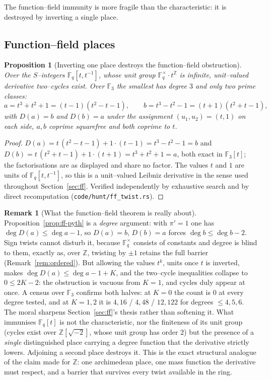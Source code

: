 \documentclass[11pt]{article}
\newtheorem{proposition}[theorem]{Proposition}
\theoremstyle{definition}
\newtheorem{remark}[theorem]{Remark}
\begin{document}
The function--field immunity is more fragile than the characteristic: it is destroyed by inverting
a single place.

\subsection{Function--field places}\label{ssec:ffplaces}

\begin{proposition}[Inverting one place destroys the function--field obstruction]\label{prop:ffsunit}
Over the $S$--integers $\mathbb{F}_q[t,t^{-1}]$, whose unit group $\mathbb{F}_q^\times\cdot t^{\mathbb{Z}}$
is infinite, unit--valued derivative two--cycles exist. Over $\mathbb{F}_3$ the smallest has degree
$3$ and only \emph{two} prime classes:
\[ a=t^3+t^2+1=(t-1)(t^2-t-1),\qquad b=t^3-t^2-1=(t+1)(t^2+t-1), \]
with $D(a)=b$ and $D(b)=a$ under the assignment $(u_1,u_2)=(t,1)$ on each side, $a,b$ coprime
squarefree and both coprime to $t$.
\end{proposition}
\begin{proof}
$D(a)=t\,(t^2-t-1)+1\cdot(t-1)=t^3-t^2-1=b$ and $D(b)=t\,(t^2+t-1)+1\cdot(t+1)=t^3+t^2+1=a$, both
exact in $\mathbb{F}_3[t]$; the factorisations are as displayed and share no factor. The values
$t$ and $1$ are units of $\mathbb{F}_q[t,t^{-1}]$, so this is a unit--valued Leibniz derivative in
the sense used throughout Section~\ref{sec:ff}. Verified independently by exhaustive search and by
direct recomputation (\texttt{code/hunt/ff\_twist.rs}).
\end{proof}

\begin{remark}[What the function--field theorem is really about]\label{rem:ffplaces}
Proposition~\ref{prop:ff-pyth} is a \emph{degree} argument: with $\pi'=1$ one has
$\deg D(a)\le\deg a-1$, so $D(a)=b$, $D(b)=a$ forces $\deg b\le\deg b-2$. Sign twists cannot
disturb it, because $\mathbb{F}_q^\times$ consists of constants and degree is blind to them,
exactly as, over $\mathbb{Z}$, twisting by $\pm1$ retains the full barrier
(Remark~\ref{rem:ordered}). But allowing the values $t^{k}$, units once $t$ is inverted, makes
$\deg D(a)\le\deg a-1+K$, and the two--cycle inequalities collapse to $0\le2K-2$: the obstruction
is vacuous from $K=1$, and cycles duly appear at once. A census over $\mathbb{F}_3$ confirms both
halves: at $K=0$ the count is $0$ at every degree tested, and at $K=1,2$ it is
$4,16$ / $4,48$ / $12,122$ for degrees $\le4,5,6$.
The moral sharpens Section~\ref{sec:ff}'s thesis rather than softening it. What immunises
$\mathbb{F}_q[t]$ is not the characteristic, nor the finiteness of its unit group (cycles exist
over $\mathbb{Z}[\sqrt{-2}]$, whose unit group has order $2$) but the presence of a
\emph{single} distinguished place carrying a degree function that the derivative strictly lowers.
Adjoining a second place destroys it. This is the exact structural analogue of the claim made for
$\mathbb{Z}$: one archimedean place, one mass function the derivative must respect, and a barrier
that survives every twist available in the ring.
\end{remark}
\end{document}
